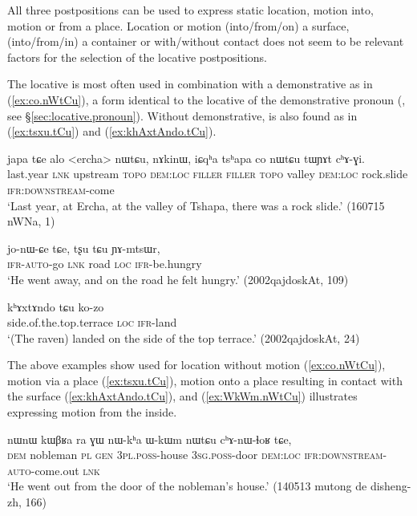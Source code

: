 All three postpositions can be used to express static location, motion into, motion or from a place. Location or motion (into/from/on) a surface, (into/from/in) a container or with/without contact does not seem to be relevant factors for the selection of the locative postpositions.

The locative   is most often used in combination with a demonstrative  as in (\ref{ex:co.nWtCu}), a form identical to the locative of the demonstrative pronoun (, see §\ref{sec:locative.pronoun}). Without demonstrative,  is also found as in (\ref{ex:tsxu.tCu}) and (\ref{ex:khAxtAndo.tCu}).

\begin{exe}
\ex \label{ex:co.nWtCu}
\gll japa tɕe alo <ercha> nɯtɕu, nɤkinɯ, iɕqʰa tsʰapa co nɯtɕu tɯɲɤt cʰɤ-ɣi. \\
last.year \textsc{lnk} upstream  \textsc{topo} \textsc{dem}:\textsc{loc} \textsc{filler}   \textsc{filler}   \textsc{topo} valley \textsc{dem}:\textsc{loc} rock.slide \textsc{ifr}:\textsc{downstream}-come \\
\glt `Last year, at Ercha, at the valley of Tshapa, there was a rock slide.' (160715 nWNa, 1)
\end{exe}

\begin{exe}
\ex \label{ex:tsxu.tCu}
\gll jo-nɯ-ɕe tɕe, tʂu tɕu ɲɤ-mtsɯr, \\
\textsc{ifr}-\textsc{auto}-go \textsc{lnk} road \textsc{loc} \textsc{ifr}-be.hungry \\
\glt `He went away, and on the road he felt hungry.' (2002qajdoskAt, 109)
\end{exe}

\begin{exe}
\ex \label{ex:khAxtAndo.tCu}
\gll  kʰɤxtɤndo tɕu ko-zo \\
side.of.the.top.terrace \textsc{loc} \textsc{ifr}-land \\
\glt `(The raven) landed on the side of the top terrace.' (2002qajdoskAt, 24)
\end{exe}

The above examples show  used for location without motion (\ref{ex:co.nWtCu}), motion via a place (\ref{ex:tsxu.tCu}), motion onto a place resulting in contact with the surface (\ref{ex:khAxtAndo.tCu}), and (\ref{ex:WkWm.nWtCu}) illustrates  expressing motion from the inside.

\begin{exe}
\ex \label{ex:WkWm.nWtCu}
\gll nɯnɯ kɯβʁa ra ɣɯ nɯ-kʰa ɯ-kɯm nɯtɕu cʰɤ-nɯ-ɬoʁ tɕe, \\
\textsc{dem} nobleman \textsc{pl} \textsc{gen} \textsc{3pl}.\textsc{poss}-house \textsc{3sg}.\textsc{poss}-door \textsc{dem}:\textsc{loc} \textsc{ifr}:\textsc{downstream}-\textsc{auto}-come.out \textsc{lnk} \\
\glt  `He went out from the door of the nobleman's house.' (140513 mutong de disheng-zh, 166)
\end{exe}

